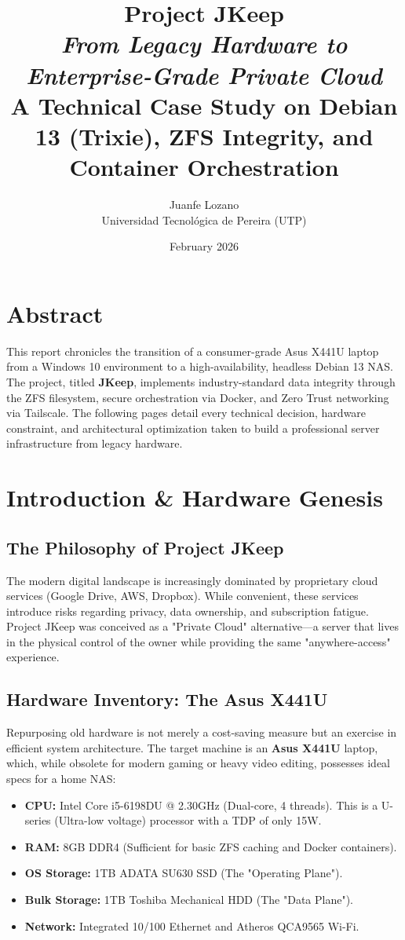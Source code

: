 \documentclass[12pt,a4paper,oneside]{book}
\title{
    \vspace{2cm}
    \Huge \textbf{Project JKeep} \\
    \vspace{0.5cm}
    \LARGE \textit{From Legacy Hardware to Enterprise-Grade Private Cloud} \\
    \vspace{1cm}
    \large A Technical Case Study on Debian 13 (Trixie), ZFS Integrity, and Container Orchestration \\
    \vfill
}
\author{Juanfe Lozano \\ \small Universidad Tecnológica de Pereira (UTP)}
\date{February 2026}
\begin{document}
\maketitle

\chapter*{Abstract}
This report chronicles the transition of a consumer-grade Asus X441U laptop from a Windows 10 environment to a high-availability, headless Debian 13 NAS. The project, titled \textbf{JKeep}, implements industry-standard data integrity through the ZFS filesystem, secure orchestration via Docker, and Zero Trust networking via Tailscale. The following pages detail every technical decision, hardware constraint, and architectural optimization taken to build a professional server infrastructure from legacy hardware.

\tableofcontents

\chapter{Introduction \& Hardware Genesis}

\section{The Philosophy of Project JKeep}
The modern digital landscape is increasingly dominated by proprietary cloud services (Google Drive, AWS, Dropbox). While convenient, these services introduce risks regarding privacy, data ownership, and subscription fatigue. Project JKeep was conceived as a "Private Cloud" alternative—a server that lives in the physical control of the owner while providing the same "anywhere-access" experience.

\section{Hardware Inventory: The Asus X441U}
Repurposing old hardware is not merely a cost-saving measure but an exercise in efficient system architecture. The target machine is an \textbf{Asus X441U} laptop, which, while obsolete for modern gaming or heavy video editing, possesses ideal specs for a home NAS:

\begin{itemize}
    \item \textbf{CPU:} Intel Core i5-6198DU @ 2.30GHz (Dual-core, 4 threads). This is a U-series (Ultra-low voltage) processor with a TDP of only 15W.
    \item \textbf{RAM:} 8GB DDR4 (Sufficient for basic ZFS caching and Docker containers).
    \item \textbf{OS Storage:} 1TB ADATA SU630 SSD (The "Operating Plane").
    \item \textbf{Bulk Storage:} 1TB Toshiba Mechanical HDD (The "Data Plane").
    \item \textbf{Network:} Integrated 10/100 Ethernet and Atheros QCA9565 Wi-Fi.
\end{itemize}
\end{document}
